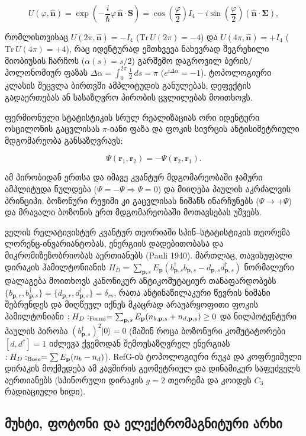 \documentclass[11pt,a4paper]{article}
\begin{document}
\[
U(\varphi, \hat{\mathbf{n}}) = \exp\!\left(-\frac{i}{\hbar}\varphi\,\hat{\mathbf{n}}\cdot\mathbf{S}\right) = \cos\!\left(\frac{\varphi}{2}\right)I_4 - i\sin\!\left(\frac{\varphi}{2}\right)(\hat{\mathbf{n}}\cdot\boldsymbol{\Sigma}),
\]

რომლისთვისაც $U(2\pi, \hat{\mathbf{n}}) = -I_4$ ($\mathrm{Tr}\,U(2\pi) = -4$) და $U(4\pi, \hat{\mathbf{n}}) = +I_4$ ($\mathrm{Tr}\,U(4\pi) = +4$), რაც იდენტურად ემთხვევა ნახევრად შეგრეხილი მიობიუსის ჩარჩოს ($\alpha(s) = s/2$) გარშემო დაგროვილ ბერის/ჰოლონომიურ ფაზას $\Delta\alpha = \int_0^{2\pi}\frac{1}{2}\,ds = \pi$ ($e^{i\Delta\alpha} = -1$). ტოპოლოგიური კლასის შეცვლა ბირთვში ამპლიტუდის განულებას, დეფექტის გადაერთებას ან სასაზღვრო პირობის ცვლილებას მოითხოვს.

ფერმიონული სტატისტიკის სრულ რეალიზაციას ორი იდენტური ოსცილონის გაცვლისას $\pi$-იანი ფაზა და ფოკის სივრცის ანტისიმეტრიული მდგომარეობა განსაზღვრავს:

\[
\Psi(\mathbf{r}_1, \mathbf{r}_2) = -\Psi(\mathbf{r}_2, \mathbf{r}_1).
\]

ამ პირობიდან ერთსა და იმავე კვანტურ მდგომარეობაში ჯამური ამპლიტუდა ნულდება ($\Psi=-\Psi\Rightarrow\Psi=0$) და მიიღება პაულის აკრძალვის პრინციპი. ბოზონური რეჟიმი კი გაცვლისას ნიშანს ინარჩუნებს ($\Psi\to+\Psi$) და მრავალი ბოზონის ერთ მდგომარეობაში მოთავსებას უშვებს.

ველის რელატივისტურ კვანტურ თეორიაში სპინ–სტატისტიკის თეორემა ლორენც-ინვარიანტობას, ენერგიის დადებითობასა და მიკრომიზეზობრიობას აერთიანებს (Pauli 1940). მართლაც, თავისუფალი დირაკის ჰამილტონიანის $H_D = \sum_{\mathbf{p},s} E_{\mathbf{p}}\left(b_{\mathbf{p},s}^\dagger b_{\mathbf{p},s} - d_{\mathbf{p},s} d_{\mathbf{p},s}^\dagger\right)$ ნორმალური დალაგება მოითხოვს კანონიკურ ანტიკომუტაციურ თანაფარდობებს $\{b_{\mathbf{p},r}, b_{\mathbf{p},s}^\dagger\} = \{d_{\mathbf{p},r}, d_{\mathbf{p},s}^\dagger\} = \delta_{rs}$, რათა ანტინაწილაკური წევრის ნიშანი შებრუნდეს და მიღწეულ იქნეს მკაცრად არაუარყოფითი ფოკის ჰამილტონიანი $:H_D:_{\rm Fermi} = \sum_{\mathbf{p},s} E_{\mathbf{p}}(n_{b,\mathbf{p},s} + n_{d,\mathbf{p},s}) \ge 0$ და ნილპოტენტური პაულის პირობა $(b_{\mathbf{p},s}^\dagger)^2|0\rangle = 0$ (მაშინ როცა ბოზონური კომუტატორები $[d, d^\dagger] = 1$ იძლევა ქვემოდან შემოუსაზღვრელ ენერგიას $:H_D:_{\rm Bose} = \sum E_{\mathbf{p}}(n_b - n_d)$). RefG-ის ტოპოლოგიური რუკა და კოფრეიმული დირაკის მოქმედება ამ კავშირის გეომეტრიულ და დინამიკურ საფუძველს აერთიანებს (სპინორული დირაკის $g=2$ თეორემა და კოიდეს $C_3$ რადიაციული ხიდი).


\subsection{მუხტი, ფოტონი და ელექტრომაგნიტური არხი}
\end{document}
